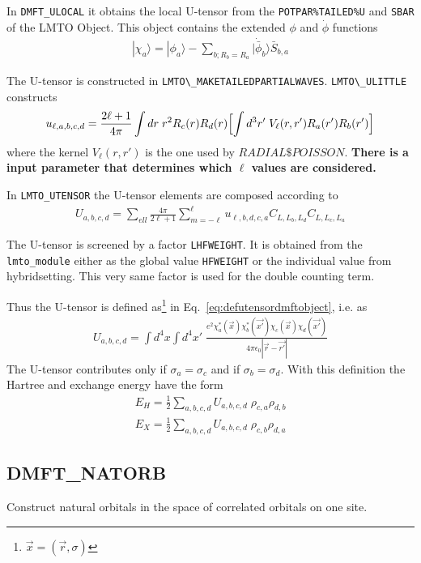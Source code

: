 \documentclass[11pt,a4paper]{report}
\begin{document}
In \verb|DMFT_ULOCAL| it obtains the local U-tensor from the
\verb|POTPAR%TAILED%U| and \verb|SBAR| of the LMTO Object. This object
contains the extended $\phi$ and $\dot{\phi}$ functions
\begin{eqnarray}
|\chi_a\rangle=|\phi_a\rangle-
\sum_{b; R_b=R_a}|\dot{\bar{\phi}}_b\rangle \bar{S}_{b,a}
\end{eqnarray}


The U-tensor is constructed in \verb|LMTO\_MAKETAILEDPARTIALWAVES|.
\verb|LMTO\_ULITTLE| constructs
\begin{eqnarray}
u_{\ell,a,b,c,d}
=\frac{2\ell+1}{4\pi}
\int dr\; r^2R_c(r)R_d(r)\Bigl[\int d^3r'\;V_\ell(r,r')R_a(r')R_b(r')\Bigr]
\end{eqnarray}
where the kernel $V_\ell(r,r')$ is the one used by $RADIAL\$POISSON$.
\textbf{There is a input parameter that determines which $\ell$ values are
considered.}

In \verb|LMTO_UTENSOR| the U-tensor elements are composed according to
\begin{eqnarray}
U_{a,b,c,d}=\sum_{ell}\frac{4\pi}{2\ell+1}\sum_{m=-\ell}^\ell
u_{\ell,b,d,c,a} C_{L,L_b,L_d}C_{L,L_c,L_a}
\end{eqnarray}

The U-tensor is screened by a factor \verb|LHFWEIGHT|. It is obtained
from the \verb|lmto_module| either as the global value \verb|HFWEIGHT|
or the individual value from hybridsetting. This very same factor is
used for the double counting term.

Thus the U-tensor is defined as\footnote{$\vec{x}=(\vec{r},\sigma)$}
in Eq.~\ref{eq:defutensordmftobject}, i.e. as
\begin{eqnarray}
U_{a,b,c,d}=\int d^4x\int d^4x'\;
\frac{e^2\chi^*_a(\vec{x})\chi^*_b(\vec{x'})\chi_c(\vec{x})\chi_d(\vec{x'})}
{4\pi\epsilon_0|\vec{r}-\vec{r'}|}
\end{eqnarray}
The U-tensor contributes only if $\sigma_a=\sigma_c$ and if
$\sigma_b=\sigma_d$.
With this definition the Hartree and exchange  energy have the form
\begin{eqnarray}
E_H=\frac{1}{2}\sum_{a,b,c,d}U_{a,b,c,d}\;\rho_{c,a}\rho_{d,b}
\nonumber\\
E_X=\frac{1}{2}\sum_{a,b,c,d}U_{a,b,c,d}\;\rho_{c,b}\rho_{d,a}
\end{eqnarray}


\subsection{DMFT\_NATORB}
Construct natural orbitals in the space of correlated orbitals on one
site.
\end{document}
